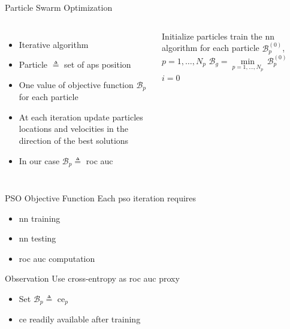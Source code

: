 \documentclass[10pt]{beamer}
\begin{document}
\begin{frame}{Particle Swarm Optimization}
\begin{columns}
\begin{itemize}
\item Iterative algorithm 
\item Particle $\triangleq$ set of \acp{ap} position
\item One value of objective function  $\mathcal{B}_p$ for each particle
\item At each iteration update particles locations and velocities in the direction of the best solutions
\item In our case $\mathcal{B}_p \triangleq$ \ac{roc} \ac{auc}
\end{itemize} 


\fontsize{9}{9}
\begin{algorithm}[H]

\tiny

Initialize particles\;
train the \ac{nn} algorithm for each particle\;
$\mathcal{B}_p^{(0)}$, $p=1,\ldots,N_p$\;
$\mathcal{B}_g=\underset{p=1,\ldots,N_p}{\min} \, \mathcal{B}_p^{(0)}$\;
$i = 0$\;

\end{algorithm}     
\end{columns}

\end{frame}

\begin{frame}{PSO Objective Function}
Each \ac{pso} iteration requires
\begin{itemize}
	\item \ac{nn} training
	\item \ac{nn} testing
	\item \ac{roc} \ac{auc} computation
\end{itemize}

\begin{block}{Observation}
	Use cross-entropy as \ac{roc} \ac{auc} proxy
\end{block}
\begin{itemize}
\item Set $\mathcal{B}_p \triangleq$ \ac{ce}$_p$
\item \ac{ce} readily available after training
\end{itemize}   
\end{frame}
\end{document}
